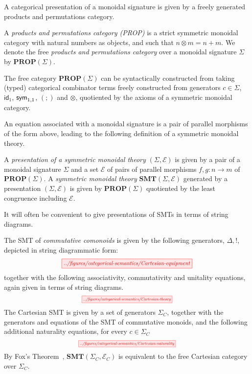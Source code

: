 \documentclass[sigconf, 9pt, nonacm]{acmart}
\begin{document}
A categorical presentation of a monoidal signature is given by a freely generated products and permutations category.  
\begin{definition}
A \textit{products and permutations category (PROP)} is a strict symmetric monoidal category with natural numbers as objects,  and such that $n \otimes m = n+m$.
We denote the free \textit{products and permutations category} over a monoidal signature $\Sigma$ by $\textbf{PROP}(\Sigma)$.  
\end{definition}
The free category $\textbf{PROP}(\Sigma)$ can be syntactically constructed from taking (typed) categorical combinator terms freely constructed from generators $c \in \Sigma$, $\textsf{id}_1$, $\textsf{sym}_{1,1}$, $(;\!)$ and $\otimes$, quotiented by the axioms of a symmetric monoidal category.

An equation associated with a monoidal signature is a pair of parallel morphisms of the form above, leading to the following definition of a symmetric monoidal theory. 
\begin{definition}
A \textit{presentation of a symmetric monoidal theory} $(\Sigma, \mathcal{E})$ is given by a pair of a monoidal signature $\Sigma$ and a set $\mathcal{E}$ of pairs of parallel morphisms $f,g: n \to m$ of $\textbf{PROP}(\Sigma)$.
A \textit{symmetric monoidal theory} $\textbf{SMT}(\Sigma,\mathcal{E})$ generated by a presentation $(\Sigma, \mathcal{E})$ is given by $\textbf{PROP}(\Sigma)$ quotiented by the least congruence including $\mathcal{E}$.
\end{definition}

It will often be convenient to give presentations of SMTs in terms of string diagrams.
\begin{example}
\label{example:csmt}
The SMT of \textit{commutative comonoids} is given by the following generators, ${\Delta, !}$, depicted in string diagrammatic form:
\[
	\scalebox{0.8}{
  	 \tikzfig{../figures/categorical-semantics/Cartesian-equipment}
	}
\]
together with the following associativity, commutativity and unitality equations, again given in terms of string diagrams. 
\[
	\scalebox{0.6}{
	\tikzfig{../figures/categorical-semantics/Cartesian-theory}	
	}
\]
The Cartesian SMT is given by a set of generators $\Sigma_C$, together with the generators and equations of the SMT of commutative monoids, and the following additional naturality equations, for every $c \in \Sigma_C$
\[
	\scalebox{0.6}{
	\tikzfig{../figures/categorical-semantics/Cartesian-naturality}
	}
\]
By Fox's Theorem~\cite{fox},  $\textbf{SMT}(\Sigma_C, \mathcal{E}_C)$ is equivalent to the free Cartesian category over $\Sigma_C$. 
\end{example}
\end{document}
